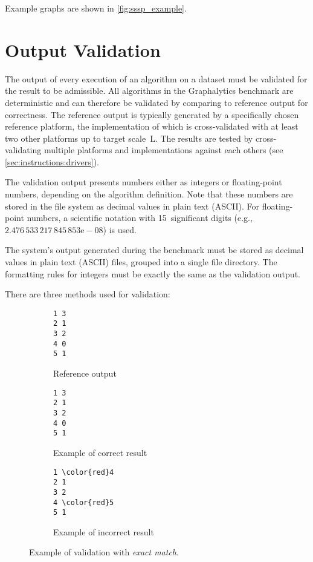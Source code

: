 Example graphs are shown in \autoref{fig:sssp_example}.




\section{Output Validation}
\label{sec:definitions_validation}

The output of every execution of an algorithm on a dataset must be validated for the result to be admissible. All algorithms in the Graphalytics benchmark are deterministic and can therefore be validated by comparing to reference output for correctness. The reference output is typically generated by a specifically chosen reference platform, the implementation of which is cross-validated with at least two other platforms up to target scale~L.  The results are tested by cross-validating multiple platforms and implementations against each others (see \autoref{sec:instructions:drivers}).

The validation output presents numbers either as integers or floating-point numbers, depending on the algorithm definition. Note that these numbers are stored in the file system as decimal values in plain text (ASCII).
For floating-point numbers, a scientific notation with 15~significant digits (e.g., $2.476\,533\,217\,845\,853\mathrm{e-}08$) is used.

The system's output generated during the benchmark must be stored as decimal values in plain text (ASCII) files, grouped into a single file directory. The formatting rules for integers must be exactly the same as the validation output.

There are three methods used for validation:

\begin{figure}[h]
\centering
\begin{subfigure}{0.3\textwidth}
\begin{Verbatim}[frame=single]
1 3
2 1
3 2
4 0
5 1
\end{Verbatim}
\caption{Reference output}
\end{subfigure}
\begin{subfigure}{0.3\textwidth}
\begin{Verbatim}[frame=single]
1 3
2 1
3 2
4 0
5 1
\end{Verbatim}
\caption{Example of correct result}
\end{subfigure}
\begin{subfigure}{0.3\textwidth}
\begin{Verbatim}[frame=single,commandchars=\\\{\}]
1 \color{red}4
2 1
3 2
4 \color{red}5
5 1
\end{Verbatim}
\caption{Example of incorrect result}
\end{subfigure}
\caption{Example of validation with \emph{exact match}.}
\label{fig:definition_validation_exact}
\end{figure}



